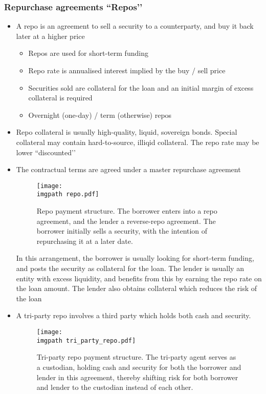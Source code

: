 \documentclass[../notes_compiled.tex]{subfiles}
\begin{document}
\subsubsection*{Repurchase agreements ``Repos’’}
\begin{itemize}
\item A repo is an agreement to sell a security to a counterparty, and buy it back later at a higher price
\begin{itemize}
\item Repos are used for short-term funding
\item Repo rate is annualised interest implied by the buy / sell price
\item Securities sold are collateral for the loan and an initial margin of excess collateral is required
\item Overnight (one-day) / term (otherwise) repos
\end{itemize}
\item Repo collateral is usually high-quality, liquid, sovereign bonds. Special collateral may contain hard-to-source, illiqid collateral. The repo rate may be lower ``discounted’’
\item The contractual terms are agreed under a master repurchase agreement
\begin{figure}[h!]
\centering
\texttt{[image: \\imgpath repo.pdf]}
\caption{Repo payment structure. The borrower enters into a repo agreement, and the lender a reverse-repo agreement. The borrower initially sells a security, with the intention of repurchasing it at a later date.}
\end{figure}
In this arrangement, the borrower is usually looking for short-term funding, and posts the security as collateral for the loan. The lender is usually an entity with excess liquidity, and benefits from this by earning the repo rate on the loan amount. The lender also obtains collateral which reduces the risk of the loan
\item A tri-party repo involves a third party which holds both cash and security.
\vspace{-.3cm}
\begin{figure}[h!]
\centering
\texttt{[image: \\imgpath tri\_party\_repo.pdf]}
\caption{Tri-party repo payment structure. The tri-party agent serves as a custodian, holding cash and security for both the borrower and lender in this agreement, thereby shifting risk for both borrower and lender to the custodian instead of each other.}
\end{figure}

\end{itemize}
\end{document}
